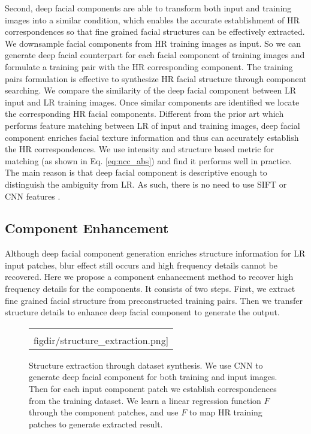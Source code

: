 \documentclass{article}
\newcommand{\figdir}{figures}
\begin{document}
Second, deep facial components are able to transform both input and training images into a similar condition, which enables the accurate establishment of HR correspondences so that fine grained facial structures can be effectively extracted. We downsample facial components from HR training images as input. So we can generate deep facial counterpart for each facial component of training images and formulate a training pair with the HR corresponding component. The training pairs formulation is effective to synthesize HR facial structure through component searching. We compare the similarity of the deep facial component between LR input and LR training images. Once similar components are identified we locate the corresponding HR facial components. Different from the prior art which performs feature matching between LR of input and training images, deep facial component enriches facial texture information and thus can accurately establish the HR correspondences. We use intensity and structure based metric for matching (as shown in Eq. \ref{eq:ncc_abs}) and find it performs well in practice. The main reason is that deep facial component is descriptive enough to distinguish the ambiguity from LR. As such, there is no need to use SIFT \cite{lowe-ijcv04-sift} or CNN features \cite{rbg-cvpr14-RCNN}.

\subsection{Component Enhancement}\label{sec::structure_enhancement}
Although deep facial component generation enriches structure information for LR input patches, blur effect still occurs and high frequency details cannot be recovered. Here we propose a component enhancement method to recover high frequency details for the components. It consists of two steps. First, we extract fine grained facial structure from preconstructed training pairs. Then we transfer structure details to enhance deep facial component to generate the output.

\begin{figure}[]
\begin{center}
\begin{tabular}{c}
\texttt{[image: \\figdir/structure\_extraction.png]}\\
\end{tabular}
\end{center}
\vspace{-5mm}
\caption{Structure extraction through dataset synthesis. We use CNN to generate deep facial component for both training and input images. Then for each input component patch we establish correspondences from the training dataset. We learn a linear regression function $F$ through the component patches, and use $F$ to map HR training patches to generate extracted result.}
\label{fig:structure_extraction}
\end{figure}
\end{document}
